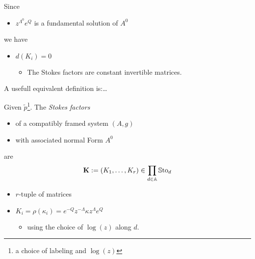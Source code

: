 \begin{paracol}{2}
\begin{defn}
\begin{itemize}
    \end{itemize}
  \end{defn}
  Since
  \begin{itemize}
    \item $z^{\Lambda^0}e^Q$ is a fundamental solution of $A^0$
  \end{itemize}
  we have
  \begin{itemize}
    \item $d(K_i)=0$
      \begin{itemize}
        \item The Stokes factors are constant invertible matrices.
      \end{itemize}
  \end{itemize}
  A usefull equivalent definition is:\dots
\end{paracol} %
\begin{defn}[1.27]
  Given $\tilde p$\footnote{a choice of labeling and $\log(z)$}.
  The \emph{Stokes factors} 
  \begin{itemize}
    \item of a compatibly framed system $(A,g)$
    \item with associated normal Form $A^0$
  \end{itemize}
  are
  \[
    \textbf{K}:=(K_1,\dots,K_r)\in\prod_{d\in\mathbb{A}}\operatorname{\mathbb{S}to}_d
  \]
  \begin{itemize}
    \item $r$-tuple of matrices
    \item $K_i=\rho(\kappa_i)=e^{-Q}z^{-\Lambda}\kappa z^\Lambda e^Q$
      \begin{itemize}
        \item using the choice of $\log(z)$ along $d$.
      \end{itemize}
  \end{itemize}
\end{defn}
